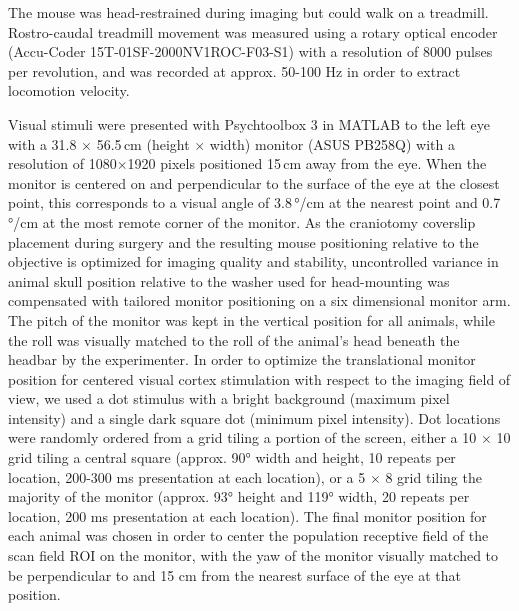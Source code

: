 \documentclass{article} %
\begin{document}
The mouse was head-restrained during imaging but could walk on a treadmill. 
Rostro-caudal treadmill movement was measured using a rotary optical encoder (Accu-Coder 15T-01SF-2000NV1ROC-F03-S1) with a resolution of 8000 pulses per revolution, and was recorded at approx. 50-100 Hz in order to extract locomotion velocity. 


Visual stimuli were presented with Psychtoolbox 3 in MATLAB \citep{Brainard1997-ed, Kleiner2007-ik, Pelli1997-vv} to the left eye with a 31.8 $\times$ 56.5\,cm (height $\times$ width) monitor (ASUS PB258Q) with a resolution of 1080$\times$1920 pixels positioned 15\,cm away from the eye.  
When the monitor is centered on and perpendicular to the surface of the eye at the closest point, this corresponds to a visual angle of 3.8\,°/cm at the nearest point and 0.7\,°/cm at the most remote corner of the monitor.  
As the craniotomy coverslip placement during surgery and the resulting mouse positioning relative to the objective is optimized for imaging quality and stability, uncontrolled variance in animal skull position relative to the washer used for head-mounting was compensated with tailored monitor positioning on a six dimensional monitor arm. 
The pitch of the monitor was kept in the vertical position for all animals, while the roll was visually matched to the roll of the animal’s head beneath the headbar by the experimenter. 
In order to optimize the translational monitor position for centered visual cortex stimulation with respect to the imaging field of view, we used a dot stimulus with a bright background (maximum pixel intensity) and a single dark square dot (minimum pixel intensity). 
Dot locations were randomly ordered from a grid tiling a portion of the screen, either a 10 $\times$ 10 grid tiling a central square (approx. 90° width and height, 10 repeats per location, 200-300 ms presentation at each location), or a 5 $\times$ 8 grid tiling the majority of the monitor (approx. 93° height and 119° width, 20 repeats per location, 200 ms presentation at each location). 
The final monitor position for each animal was chosen in order to center the population receptive field of the scan field ROI on the monitor, with the yaw of the monitor visually matched to be perpendicular to and 15 cm from the nearest surface of the eye at that position.  
\end{document}
